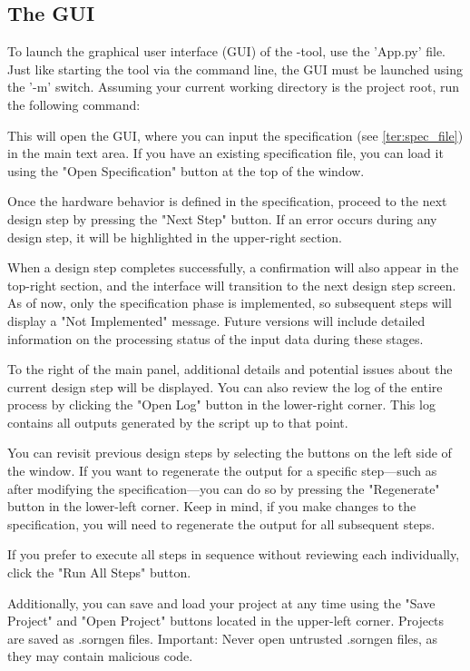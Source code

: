 \documentclass{article}
\begin{document}
\subsection{The GUI} 
\label{ter:starting_gui}
To launch the graphical user interface (GUI) of the \ProjectName-tool, use the 'App.py' file.
Just like starting the tool via the command line, the GUI must be launched using the '-m' switch. Assuming your current working directory is the project root, run the following command:


This will open the GUI, where you can input the specification (see \ref{ter:spec_file}) in the main text area. If you have an existing specification file, you can load it using the "Open Specification" button at the top of the window.

Once the hardware behavior is defined in the specification, proceed to the next design step by pressing the "Next Step" button. If an error occurs during any design step, it will be highlighted in the upper-right section.

When a design step completes successfully, a confirmation will also appear in the top-right section, and the interface will transition to the next design step screen. As of now, only the specification phase is implemented, so subsequent steps will display a "Not Implemented" message. Future versions will include detailed information on the processing status of the input data during these stages.

To the right of the main panel, additional details and potential issues about the current design step will be displayed. You can also review the log of the entire process by clicking the "Open Log" button in the lower-right corner. This log contains all outputs generated by the script up to that point.

You can revisit previous design steps by selecting the buttons on the left side of the window. If you want to regenerate the output for a specific step—such as after modifying the specification—you can do so by pressing the "Regenerate" button in the lower-left corner. Keep in mind, if you make changes to the specification, you will need to regenerate the output for all subsequent steps.

If you prefer to execute all steps in sequence without reviewing each individually, click the "Run All Steps" button.

Additionally, you can save and load your project at any time using the "Save Project" and "Open Project" buttons located in the upper-left corner. Projects are saved as .sorngen files. Important: Never open untrusted .sorngen files, as they may contain malicious code.
\end{document}
